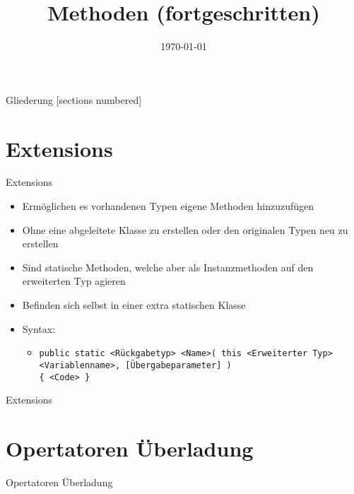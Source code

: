 



\title{Methoden (fortgeschritten)}
\date{\today}




\maketitle

\begin{frame}{Gliederung}
	[sections numbered]
	\tableofcontents
\end{frame}

\section{Extensions}
\begin{frame}{Extensions}
	\begin{itemize}
		\item Ermöglichen es vorhandenen Typen eigene Methoden hinzuzufügen
		\item Ohne eine abgeleitete Klasse zu erstellen oder den originalen Typen neu zu erstellen
		\item Sind statische Methoden, welche aber als Instanzmethoden auf den erweiterten Typ agieren
		\item Befinden sich selbst in einer extra statischen Klasse
		\item Syntax:
		\begin{itemize}
			\item \texttt{public static \alert{<Rückgabetyp> <Name>}( this \alert{<Erweiterter Typ> <Variablenname>}, \alert{[Übergabeparameter]} )\\ \{ \alert{<Code>} \}}
		\end{itemize}
	\end{itemize}
\end{frame}

\begin{frame}{Extensions}
	
\end{frame}

\section{Opertatoren Überladung}
\begin{frame}{Opertatoren Überladung}

\end{frame}


